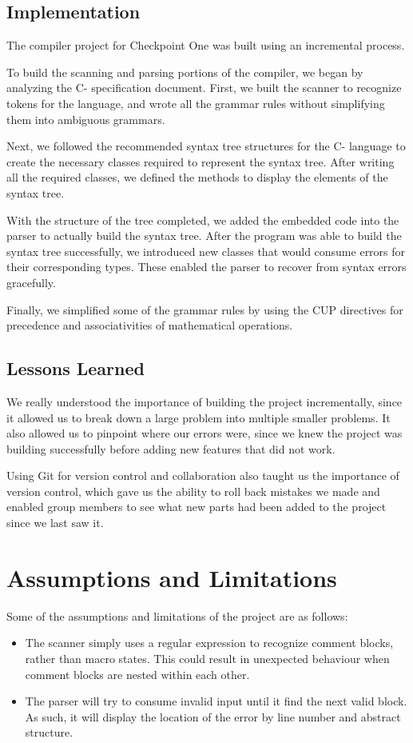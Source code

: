 \documentclass[12pt,letterpaper]{article}
\begin{document}
\subsection{Implementation}
The compiler project for Checkpoint One was built using an incremental process.\par
To build the scanning and parsing portions of the compiler, we began by analyzing the C- specification document. First, we built the scanner to recognize tokens for the language, and wrote all the grammar rules without simplifying them into ambiguous grammars.\par
Next, we followed the recommended syntax tree structures for the C- language to create the necessary classes required to represent the syntax tree. After writing all the required classes, we defined the methods to display the elements of the syntax tree.\par
With the structure of the tree completed, we added the embedded code into the parser to actually build the syntax tree. After the program was able to build the syntax tree successfully, we introduced new classes that would consume errors for their corresponding types. These enabled the parser to recover from syntax errors gracefully.\par
Finally, we simplified some of the grammar rules by using the CUP directives for precedence and associativities of mathematical operations.\par

\subsection{Lessons Learned}
We really understood the importance of building the project incrementally, since it allowed us to break down a large problem into multiple smaller problems. It also allowed us to pinpoint where our errors were, since we knew the project was building successfully before adding new features that did not work.\par
Using Git for version control and collaboration also taught us the importance of version control, which gave us the ability to roll back mistakes we made and enabled group members to see what new parts had been added to the project since we last saw it.\par

\section{Assumptions and Limitations}
Some of the assumptions and limitations of the project are as follows:
\begin{itemize}[leftmargin=12pt]
\setlength\itemsep{0em}
\item The scanner simply uses a regular expression to recognize comment blocks, rather than macro states. This could result in unexpected behaviour when comment blocks are nested within each other.
\item The parser will try to consume invalid input until it find the next valid block. As such, it will display the location of the error by line number and abstract structure.
\end{itemize}
\end{document}
